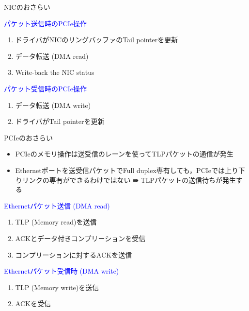 \documentclass[10pt, compress]{beamer}
\begin{document}

\begin{frame}[fragile,t]{NICのおさらい}

\hspace{-0.5em}
\textcolor{blue}{パケット送信時のPCIe操作}
\vspace{-.5em}
\begin{enumerate}
	\item ドライバがNICのリングバッファのTail pointerを更新
	\item データ転送 (DMA read)
	\item Write-back the NIC status
\end{enumerate}

\hspace{-0.5em}
\textcolor{blue}{パケット受信時のPCIe操作}
\vspace{-.5em}
\begin{enumerate}
	\item データ転送 (DMA write)
	\item ドライバがTail pointerを更新
\end{enumerate}
\end{frame}


\begin{frame}[fragile,t]{PCIeのおさらい}

\begin{itemize}
	\item PCIeのメモリ操作は送受信のレーンを使ってTLPパケットの通信が発生
	\item Ethernetポートを送受信パケットでFull duplex専有しても，PCIeでは上り下りリンクの専有ができるわけではない ⇛ TLPパケットの送信待ちが発生する
\end{itemize}

\hspace{-0.5em}
\textcolor{blue}{Ethernetパケット送信 (DMA read)}
\vspace{-.5em}
\begin{enumerate}
	\item TLP (Memory read)を送信
	\item ACKとデータ付きコンプリーションを受信
	\item コンプリーションに対するACKを送信
\end{enumerate}

\hspace{-0.5em}
\textcolor{blue}{Ethernetパケット受信時 (DMA write)}
\vspace{-.5em}
\begin{enumerate}
	\item TLP (Memory write)を送信
	\item ACKを受信
\end{enumerate}
\end{frame}
\end{document}

